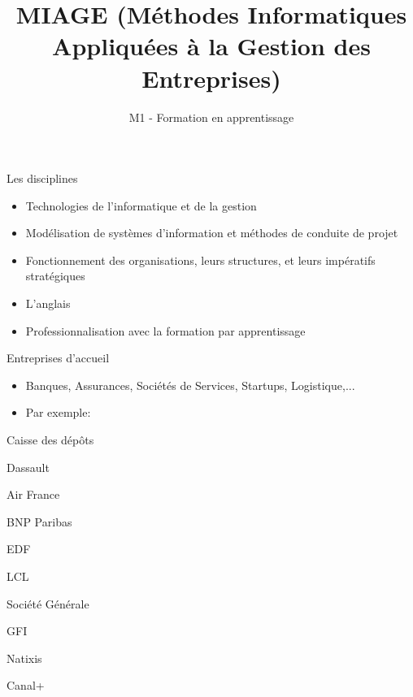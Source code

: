 \documentclass[minimal,compress]{beamer}
\title[M1 MIAGE Apprentissage]
{MIAGE (Méthodes Informatiques Appliquées à la Gestion des Entreprises)}
\author{M1 - Formation en apprentissage}
\institute{}%
\date{}
\begin{document}




\begin{frame}{Les disciplines}
\begin{itemize}
\item Technologies de l’\alert{informatique} et de la \alert{gestion}

\item Modélisation de \alert{systèmes d’information} et méthodes de \alert{conduite de projet}

\item Fonctionnement des organisations, leurs structures, et leurs impératifs stratégiques

\item L’anglais %

\item \alert{Professionnalisation} avec la formation par apprentissage
\end{itemize}
\end{frame}

\begin{frame}{Entreprises d'accueil}

\begin{itemize}
\item Banques, Assurances, Sociétés de Services, Startups, Logistique,...
\item Par exemple:
\end{itemize}

\centering
\begin{minipage}{.35\textwidth}
 Caisse des dépôts
 
 Dassault
 
 Air France
 
BNP Paribas

 EDF
 

\end{minipage}
\begin{minipage}{.35\textwidth}
 LCL
 
 Société Générale
 
GFI

 Natixis
 
 Canal+

\end{minipage}



\end{frame}
\end{document}
